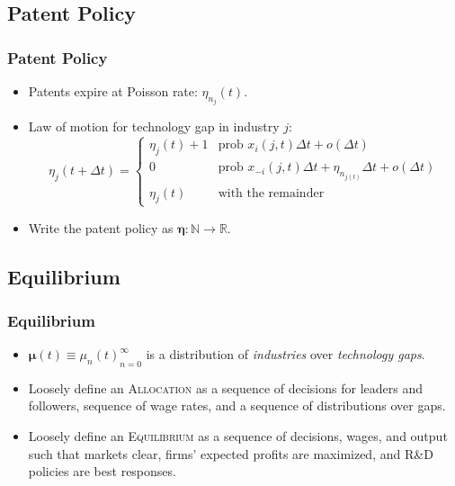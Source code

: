 \documentclass{beamer}
\begin{document}
\subsection{Patent Policy}
\label{sub:patent_policy}

\begin{frame}[t]\frametitle{Patent Policy}
  \begin{itemize}
    \item<+-> Patents expire at Poisson rate: $\eta_{n_j}(t)$.
    \item<+-> Law of motion for technology gap in industry $j$:
      \begin{equation*} \label{eq:tech_law_of_motion}
        \eta_j(t + \Delta t) =
        \begin{cases}
          \eta_j(t) + 1 & \textrm{prob } x_i(j,t)\Delta t + o(\Delta t)\\
          0 & \textrm{prob } x_{-i}(j,t)\Delta t + \eta_{n_{j(t)}}\Delta t + o(\Delta t) \\
          \eta_j(t) & \textrm{with the remainder} 
        \end{cases}
      \end{equation*}
  \item<+-> Write the patent policy as $\bm{\eta} : \mathbb{N} \rightarrow \mathbb{R}$.
  \end{itemize}
\end{frame}




\subsection{Equilibrium}
\label{sub:equilibrium}
\begin{frame}[t]\frametitle{Equilibrium} 
  \begin{itemize}

  \item<+-> $\bm{\mu}(t) \equiv {\mu_n(t)}_{n=0}^\infty$ is a distribution of \emph{industries} over \emph{technology gaps}.
  
  \item<+-> Loosely define an \textsc{Allocation} as a sequence of decisions for leaders and followers, sequence of wage rates, and a sequence of distributions over gaps.

  \item<+-> Loosely define an \textsc{Equilibrium} as a sequence of decisions, wages, and output such that markets clear, firms' expected profits are maximized, and R\&D policies are best responses. 

  \end{itemize}
\end{frame}
\end{document}
